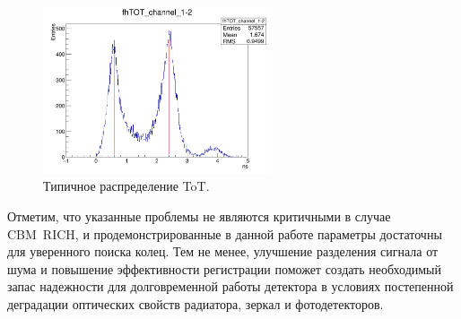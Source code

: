 \begin{figure}
\includegraphics[width=0.6\textwidth]{pictures/29_Scope_vs_data-data.png}
\caption{Типичное распределение ToT.}
\label{fig:ToTdata}
\end{figure}

Отметим, что указанные проблемы не являются критичными в случае CBM~RICH, и продемонстрированные в данной работе параметры достаточны для уверенного поиска колец. Тем не менее, улучшение разделения сигнала от шума и повышение эффективности регистрации поможет создать необходимый запас надежности для долговременной работы детектора в условиях постепенной деградации оптических свойств радиатора, зеркал и фотодетекторов.
